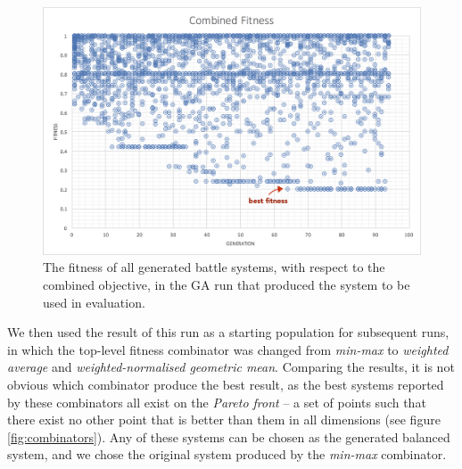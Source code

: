 \begin{figure}
	\centering
	\includegraphics[width=0.8\linewidth]{figures/j-ga}
	\caption{The fitness of all generated battle systems, with respect to the combined objective, in the GA run that produced the system to be used in evaluation.}
	\label{fig:systemj}
\end{figure}

We then used the result of this run as a starting population for subsequent runs, in which the top-level fitness combinator was changed from \textit{min-max} to \textit{weighted average} and \textit{weighted-normalised geometric mean}. Comparing the results, it is not obvious which combinator produce the best result, as the best systems reported by these combinators all exist on the \textit{Pareto front} -- a set of points such that there exist no other point that is better than them in all dimensions\cite{marler2004survey} (see figure \ref{fig:combinators}). Any of these systems can be chosen as the generated balanced system, and we chose  the original system produced by the \textit{min-max} combinator.

